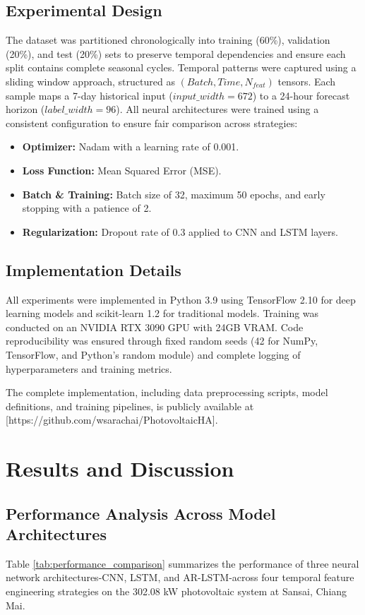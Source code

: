 \documentclass[conference]{IEEEtran}
\begin{document}
	\subsection{Experimental Design}
	The dataset was partitioned chronologically into training (60\%), validation (20\%), and test (20\%) sets to preserve temporal dependencies and ensure each split contains complete seasonal cycles. Temporal patterns were captured using a sliding window approach, structured as $(Batch, Time, N_{feat})$ tensors. Each sample maps a 7-day historical input ($input\_width=672$) to a 24-hour forecast horizon ($label\_width=96$). All neural architectures were trained using a consistent configuration to ensure fair comparison across strategies:
	\begin{itemize}
		\item \textbf{Optimizer:} Nadam with a learning rate of 0.001.
		\item \textbf{Loss Function:} Mean Squared Error (MSE).
		\item \textbf{Batch \& Training:} Batch size of 32, maximum 50 epochs, and early stopping with a patience of 2.\item \textbf{Regularization:} Dropout rate of 0.3 applied to CNN and LSTM layers.
	\end{itemize}
	
	\subsection{Implementation Details}
	All experiments were implemented in Python 3.9 using TensorFlow 2.10 for deep learning models and scikit-learn 1.2 for traditional models. Training was conducted on an NVIDIA RTX 3090 GPU with 24GB VRAM. Code reproducibility was ensured through fixed random seeds (42 for NumPy, TensorFlow, and Python's random module) and complete logging of hyperparameters and training metrics.
	
	The complete implementation, including data preprocessing scripts, model definitions, and training pipelines, is publicly available at [https://github.com/wsarachai/PhotovoltaicHA].
	
	
	\section{Results and Discussion}
	
	\subsection{Performance Analysis Across Model Architectures}
	Table \ref{tab:performance_comparison} summarizes the performance of three neural network architectures-CNN, LSTM, and AR-LSTM-across four temporal feature engineering strategies on the 302.08 kW photovoltaic system at Sansai, Chiang Mai.
	
\end{document}
